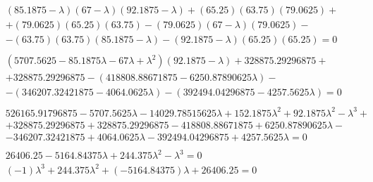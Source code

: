 \documentclass[a4paper]{article}
\begin{document}
\begin{align*}
		&(85.1875-\lambda)(67-\lambda)(92.1875-\lambda)+(65.25)(63.75)(79.0625)+
		\\
		&+(79.0625)(65.25)(63.75)-(79.0625)(67-\lambda)(79.0625)-
		\\
		&-(63.75)(63.75)(85.1875-\lambda)-(92.1875-\lambda)(65.25)(65.25)=0
		\\
		\\
		&(5707.5625-85.1875\lambda-67\lambda+\lambda^2)(92.1875-\lambda)+328875.29296875+
		\\
		&+328875.29296875-(418808.88671875-6250.87890625\lambda)-
		\\
		&-(346207.32421875-4064.0625\lambda)-(392494.04296875-4257.5625\lambda)=0
		\\
		\\
		&526165.91796875-5707.5625\lambda-14029.78515625\lambda+152.1875\lambda^2+92.1875\lambda^2-\lambda^3+
		\\
		&+328875.29296875+328875.29296875-418808.88671875+6250.87890625\lambda-
		\\
		&-346207.32421875+4064.0625\lambda-392494.04296875+4257.5625\lambda=0
		\\
		\\
		&26406.25-5164.84375\lambda+244.375\lambda^2-\lambda^3=0
		\\
		&(-1)\lambda^3+244.375\lambda^2+(-5164.84375)\lambda+26406.25=0
		\\
	\end{align*}
\end{document}
